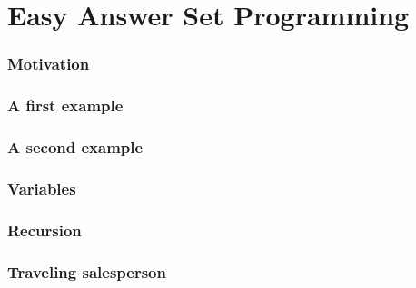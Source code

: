 \part{Easy Answer Set Programming}


\section{Motivation}
% 

\section{A first example}

\section{A second example}

\section{Variables}


\section{Recursion}

% 
\section{Traveling salesperson}

